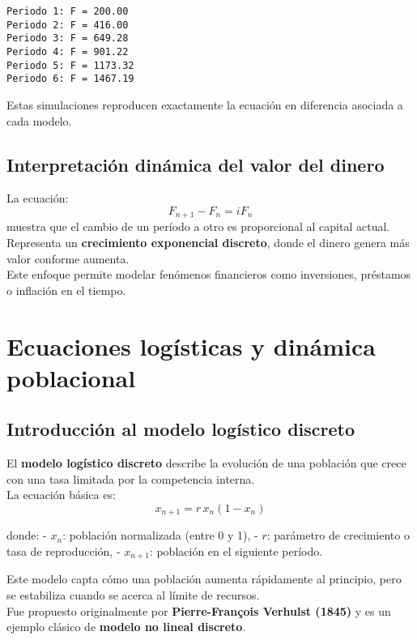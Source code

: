 \documentclass[
  letterpaper,
  DIV=11,
  numbers=noendperiod]{scrreprt}
\begin{document}
\begin{verbatim}
Periodo 1: F = 200.00
Periodo 2: F = 416.00
Periodo 3: F = 649.28
Periodo 4: F = 901.22
Periodo 5: F = 1173.32
Periodo 6: F = 1467.19
\end{verbatim}

Estas simulaciones reproducen exactamente la ecuación en diferencia
asociada a cada modelo.

\section{Interpretación dinámica del valor del
dinero}\label{interpretaciuxf3n-dinuxe1mica-del-valor-del-dinero}

La ecuación: \[
F_{n+1} - F_n = iF_n
\] muestra que el cambio de un período a otro es proporcional al capital
actual.\\
Representa un \textbf{crecimiento exponencial discreto}, donde el dinero
genera más valor conforme aumenta.\\
Este enfoque permite modelar fenómenos financieros como inversiones,
préstamos o inflación en el tiempo.


\chapter{Ecuaciones logísticas y dinámica
poblacional}\label{ecuaciones-loguxedsticas-y-dinuxe1mica-poblacional}

\section{Introducción al modelo logístico
discreto}\label{introducciuxf3n-al-modelo-loguxedstico-discreto}

El \textbf{modelo logístico discreto} describe la evolución de una
población que crece con una tasa limitada por la competencia interna.\\
La ecuación básica es: \[
x_{n+1} = r\,x_n(1 - x_n)
\]

donde: - \(x_n\): población normalizada (entre 0 y 1), - \(r\):
parámetro de crecimiento o tasa de reproducción, - \(x_{n+1}\):
población en el siguiente período.

Este modelo capta cómo una población aumenta rápidamente al principio,
pero se estabiliza cuando se acerca al límite de recursos.\\
Fue propuesto originalmente por \textbf{Pierre-François Verhulst (1845)}
y es un ejemplo clásico de \textbf{modelo no lineal discreto}.
\end{document}
